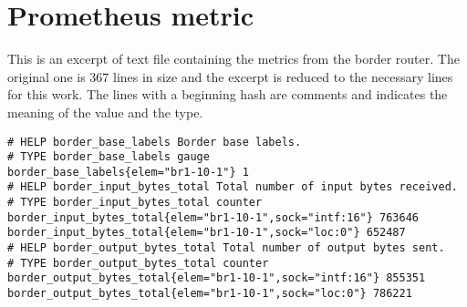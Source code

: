 \documentclass[thesis.tex]{subfiles}
\begin{document}
\section{Prometheus metric} \label{app:promMetric}

This is an excerpt of text file containing the metrics from the border router. The original one is 367 lines in size and the excerpt is reduced to the necessary lines for this work. The lines with a beginning hash are comments and indicates the meaning of the value and the type. 
\vspace{5mm}
\begin{lstlisting}[basicstyle=\scriptsize]
# HELP border_base_labels Border base labels.
# TYPE border_base_labels gauge
border_base_labels{elem="br1-10-1"} 1
# HELP border_input_bytes_total Total number of input bytes received.
# TYPE border_input_bytes_total counter
border_input_bytes_total{elem="br1-10-1",sock="intf:16"} 763646
border_input_bytes_total{elem="br1-10-1",sock="loc:0"} 652487
# HELP border_output_bytes_total Total number of output bytes sent.
# TYPE border_output_bytes_total counter
border_output_bytes_total{elem="br1-10-1",sock="intf:16"} 855351
border_output_bytes_total{elem="br1-10-1",sock="loc:0"} 786221
\end{lstlisting}
\end{document}
